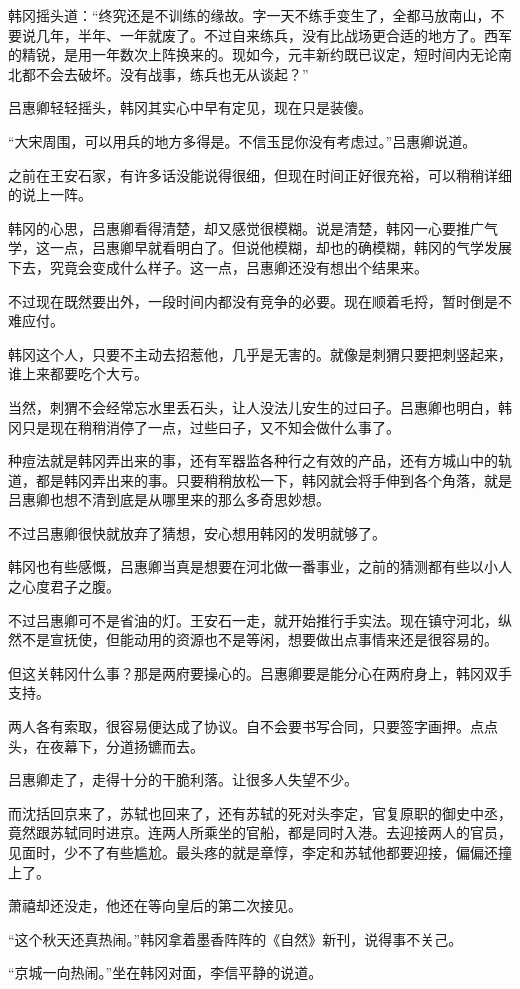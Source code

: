 韩冈摇头道：“终究还是不训练的缘故。字一天不练手变生了，全都马放南山，不要说几年，半年、一年就废了。不过自来练兵，没有比战场更合适的地方了。西军的精锐，是用一年数次上阵换来的。现如今，元丰新约既已议定，短时间内无论南北都不会去破坏。没有战事，练兵也无从谈起？”

吕惠卿轻轻摇头，韩冈其实心中早有定见，现在只是装傻。

“大宋周围，可以用兵的地方多得是。不信玉昆你没有考虑过。”吕惠卿说道。

之前在王安石家，有许多话没能说得很细，但现在时间正好很充裕，可以稍稍详细的说上一阵。

韩冈的心思，吕惠卿看得清楚，却又感觉很模糊。说是清楚，韩冈一心要推广气学，这一点，吕惠卿早就看明白了。但说他模糊，却也的确模糊，韩冈的气学发展下去，究竟会变成什么样子。这一点，吕惠卿还没有想出个结果来。

不过现在既然要出外，一段时间内都没有竞争的必要。现在顺着毛捋，暂时倒是不难应付。

韩冈这个人，只要不主动去招惹他，几乎是无害的。就像是刺猬只要把刺竖起来，谁上来都要吃个大亏。

当然，刺猬不会经常忘水里丢石头，让人没法儿安生的过曰子。吕惠卿也明白，韩冈只是现在稍稍消停了一点，过些曰子，又不知会做什么事了。

种痘法就是韩冈弄出来的事，还有军器监各种行之有效的产品，还有方城山中的轨道，都是韩冈弄出来的事。只要稍稍放松一下，韩冈就会将手伸到各个角落，就是吕惠卿也想不清到底是从哪里来的那么多奇思妙想。

不过吕惠卿很快就放弃了猜想，安心想用韩冈的发明就够了。

韩冈也有些感慨，吕惠卿当真是想要在河北做一番事业，之前的猜测都有些以小人之心度君子之腹。

不过吕惠卿可不是省油的灯。王安石一走，就开始推行手实法。现在镇守河北，纵然不是宣抚使，但能动用的资源也不是等闲，想要做出点事情来还是很容易的。

但这关韩冈什么事？那是两府要操心的。吕惠卿要是能分心在两府身上，韩冈双手支持。

两人各有索取，很容易便达成了协议。自不会要书写合同，只要签字画押。点点头，在夜幕下，分道扬镳而去。

吕惠卿走了，走得十分的干脆利落。让很多人失望不少。

而沈括回京来了，苏轼也回来了，还有苏轼的死对头李定，官复原职的御史中丞，竟然跟苏轼同时进京。连两人所乘坐的官船，都是同时入港。去迎接两人的官员，见面时，少不了有些尴尬。最头疼的就是章惇，李定和苏轼他都要迎接，偏偏还撞上了。

萧禧却还没走，他还在等向皇后的第二次接见。

“这个秋天还真热闹。”韩冈拿着墨香阵阵的《自然》新刊，说得事不关己。

“京城一向热闹。”坐在韩冈对面，李信平静的说道。

